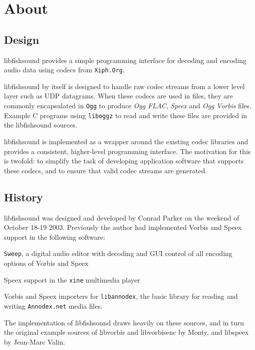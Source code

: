 \section{About}
\label{group__about}
\subsection{Design}\label{group__about_design}
libfishsound provides a simple programming interface for decoding and encoding audio data using codecs from {\tt Xiph.\-Org}.

libfishsound by itself is designed to handle raw codec streams from a lower level layer such as U\-D\-P datagrams. When these codecs are used in files, they are commonly encapsulated in {\tt Ogg} to produce {\itshape Ogg F\-L\-A\-C}, {\itshape Speex} and {\itshape Ogg Vorbis} files. Example C programs using {\tt liboggz} to read and write these files are provided in the libfishsound sources.

libfishsound is implemented as a wrapper around the existing codec libraries and provides a consistent, higher-\/level programming interface. The motivation for this is twofold\-: to simplify the task of developing application software that supports these codecs, and to ensure that valid codec streams are generated.\subsection{History}\label{group__about_history}
libfishsound was designed and developed by Conrad Parker on the weekend of October 18-\/19 2003. Previously the author had implemented Vorbis and Speex support in the following software\-:
\begin{DoxyItemize}
\item {\tt Sweep}, a digital audio editor with decoding and G\-U\-I control of all encoding options of Vorbis and Speex
\item Speex support in the {\tt xine} multimedia player
\item Vorbis and Speex importers for {\tt libannodex}, the basic library for reading and writing {\tt Annodex.\-net} media files.
\end{DoxyItemize}

The implementation of libfishsound draws heavily on these sources, and in turn the original example sources of libvorbis and libvorbisenc by Monty, and libspeex by Jean-\/\-Marc Valin.

